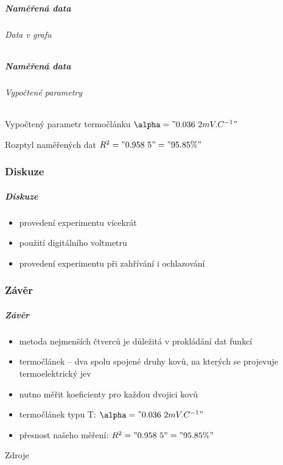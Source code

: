 \documentclass[smaller,aspectratio=1610,handout]{beamer}
\begin{document}
\begin{frame}
	\frametitle{Naměřená data}
	\framesubtitle{Data v grafu}
	\hspace{0cm}\vfill
	\small
	\vfill
\end{frame}
\begin{frame}
	\frametitle{Naměřená data}
	\framesubtitle{Vypočtené parametry}
	\begin{block}{Vypočtený parametr termočlánku}
		\centering $\alpha = "0.036~2 mV.C^{-1}"$
	\end{block}
	\begin{block}{Rozptyl naměřených dat}
		\centering $R^2="0.958~5"="95.85 \%"$
	\end{block}
\end{frame}

\section{Diskuze}
\begin{frame}
	\frametitle{Diskuze}
	\begin{itemize}
		\item provedení experimentu vícekrát
		\item použití digitálního voltmetru
		\item provedení experimentu při zahřívání i ochlazování
	\end{itemize}
\end{frame}

\section{Závěr}
\begin{frame}
	\frametitle{Závěr}
	\begin{itemize}
		\item metoda nejmenších čtverců je důležitá v prokládání dat funkcí
		\item termočlánek -- dva spolu spojené druhy kovů, na kterých se
			projevuje termoelektrický jev
		\item nutno měřit koeficienty pro každou dvojici kovů
		\item termočlánek typu T: $\alpha = "0.036~2 mV.C^{-1}"$
		\item přesnost našeho měření: $R^2="0.958~5"="95.85 \%"$
	\end{itemize}
\end{frame}

\begin{frame}[allowframebreaks=.85]{Zdroje}
	\nocite{*}
    \printbibliography[heading=none]
\end{frame}

\part{}

\begin{frame}[plain]
	\titlepage
\end{frame}
\end{document}
